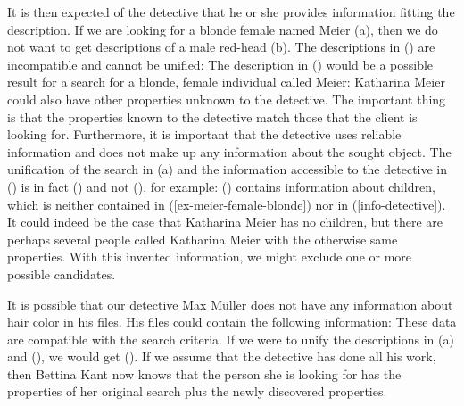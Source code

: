 It is then expected of the detective that he or she provides information fitting the description. If
we are looking for a blonde female named Meier (a), then we
do not want to get descriptions of a male red-head (b). The descriptions in () are incompatible and cannot be unified:
\eal
\ex\label{ex-meier-female-blonde}
\ex {}
\zl
The description in () would be a possible result for a search for a blonde, female individual called Meier:
\ea
\label{info-detective}
\z
Katharina Meier could also have other properties unknown to the detective. The important thing is that the properties known to the detective match those
that the client is looking for. Furthermore, it is important that the detective uses reliable information and does not make up any information about the sought
object. The unification of the search in (a) and the information accessible to the detective in () is in fact () and not (), for example:
\ea
{}
\z
() contains information about children, which is neither contained in
(\ref{ex-meier-female-blonde}) nor in (\ref{info-detective}).
It could indeed be the case that Katharina Meier has no children, but there are perhaps several people
called Katharina Meier with the otherwise same properties. With this invented information, we might
exclude one or more possible candidates. 

It is possible that our detective Max Müller does not have any information about hair color in his
files. His files could contain the following information:
\ea
{}
\z
These data are compatible with the search criteria. If we were to unify the descriptions in (a) and (), we would get ().
If we assume that the detective has done all his work, then Bettina Kant now knows that the person she is looking for has the properties of her
original search plus the newly discovered properties.

